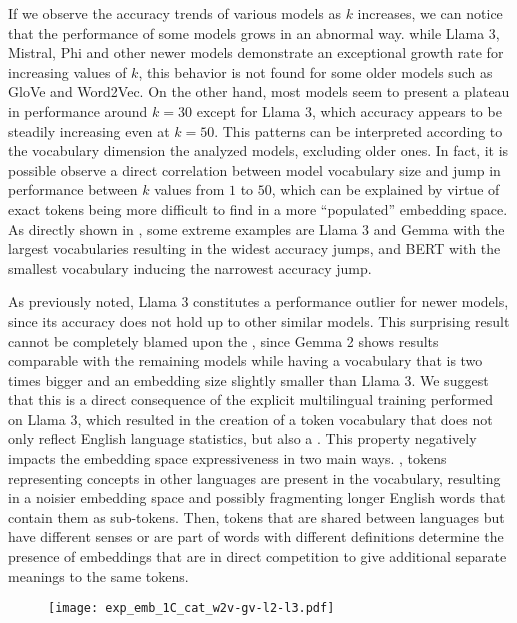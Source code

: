 If we observe the accuracy trends of various models as $k$ increases, we can notice that the performance of some models grows in an abnormal way.
 while Llama 3, Mistral, Phi and other newer models demonstrate an exceptional growth rate for increasing values of $k$, this behavior is not found for some older models such as GloVe and Word2Vec.
On the other hand, most models seem to present a plateau in performance around $k = 30$ except for Llama 3, which accuracy appears to be steadily increasing even at $k = 50$.
This patterns can be interpreted according to the vocabulary dimension the analyzed models, excluding older ones.
In fact, it is possible observe a direct correlation between model vocabulary size and jump in performance between $k$ values from $1$ to $50$, which can be explained by virtue of exact tokens being more difficult to find in a more ``populated'' embedding space.
As directly shown in , some extreme examples are Llama 3 and Gemma with the largest vocabularies resulting in the widest accuracy jumps, and BERT with the smallest vocabulary inducing the narrowest accuracy jump.

As previously noted, Llama 3 constitutes a performance outlier for newer models, since its accuracy does not hold up to other similar models.
This surprising result cannot be completely blamed upon the , since Gemma 2 shows results comparable with the remaining models while having a vocabulary that is two times bigger and an embedding size slightly smaller than Llama 3.
We suggest that this is a direct consequence of the explicit multilingual training performed on Llama 3, which resulted in the creation of a token vocabulary that does not only reflect English language statistics, but also a .
This property negatively impacts the embedding space expressiveness in two main ways.
, tokens representing concepts in other languages are present in the vocabulary, resulting in a noisier embedding space and possibly fragmenting longer English words that contain them as sub-tokens.
Then, tokens that are shared between languages but have different senses or are part of words with different definitions determine the presence of embeddings that are in direct competition to give additional separate meanings to the same tokens.

\begin{figure}[t!]
    \centering
    \texttt{[image: exp\_emb\_1C\_cat\_w2v-gv-l2-l3.pdf]}
    \caption{}
    \label{fig:exp_emb_1_D}
\end{figure}

